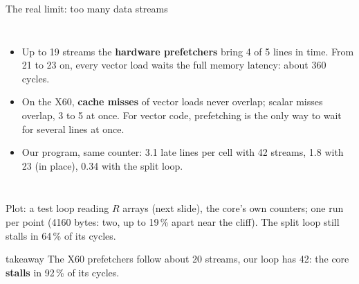 \documentclass[aspectratio=169,10pt,t]{beamer}
\newcommand{\term}[1]{\textcolor{psblue!85!black}{\textbf{#1}}} %
\newcommand{\takeaway}[1]{\par\vfill
  \begin{beamercolorbox}[wd=\textwidth,sep=4pt,rounded=true]{takeaway}
    \small #1
  \end{beamercolorbox}}
\begin{document}
\begin{frame}{The real limit: too many data streams}
  \begin{columns}[T,onlytextwidth]
    \centering
    \vspace{1mm}
    \begin{itemize}\small
      \item Up to 19 streams the \term{hardware prefetchers} bring 4 of 5 lines in time. From 21 to 23 on,
            every vector load waits the full memory latency: about 360 cycles.
      \item On the X60, \term{cache misses} of vector loads never overlap; scalar misses overlap, 3 to 5 at
            once. For vector code, prefetching is the only way to wait for several lines at once.
      \item Our program, same counter: 3.1 late lines per cell with 42 streams, 1.8 with 23 (in place),
            0.34 with the split loop.
    \end{itemize}
  \end{columns}
  \vspace{0.5mm}
  {\scriptsize\color{psgray}Plot: a test loop reading $R$ arrays (next slide), the core's own counters; one
  run per point (4160 bytes: two, up to 19\,\% apart near the cliff). The split loop still stalls in 64\,\%
  of its cycles.\par}
  \takeaway{The X60 prefetchers follow about 20 streams, our loop has 42: the core \term{stalls} in 92\,\% of its cycles.}
\end{frame}
\end{document}
